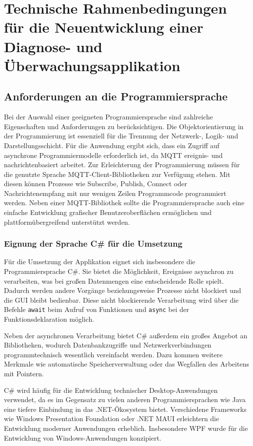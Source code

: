 \chapter{Technische Rahmenbedingungen für die Neuentwicklung einer Diagnose- und Überwachungsapplikation}
\label{cha:Anforderungsanalyse}
\section{Anforderungen an die Programmiersprache}
    Bei der Auswahl einer geeigneten Programmiersprache sind zahlreiche Eigenschaften und Anforderungen zu berücksichtigen. Die Objektorientierung in der Programmierung ist essenziell für die Trennung der Netzwerk-, Logik- und Darstellungsschicht. Für die Anwendung ergibt sich, dass ein Zugriff auf asynchrone Programmiermodelle erforderlich ist, da MQTT ereignis- und nachrichtenbasiert arbeitet.
    Zur Erleichterung der Programmierung müssen für die genutzte Sprache MQTT-Client-Bibliotheken zur Verfügung stehen. Mit diesen 
    können Prozesse wie Subscribe, Publish, Connect oder Nachrichtenempfang mit nur wenigen Zeilen Programmcode programmiert werden.
    Neben einer MQTT-Bibliothek sollte die Programmiersprache auch eine einfache Entwicklung grafischer Benutzeroberflächen ermöglichen und plattformübergreifend unterstützt werden.

    \subsection{Eignung der Sprache C\# für die Umsetzung}
       Für die Umsetzung der Applikation eignet sich insbesondere die Programmiersprache C\#. Sie bietet die Möglichkeit, Ereignisse asynchron zu verarbeiten, was bei großen Datenmengen eine entscheidende Rolle spielt. 
        Dadurch werden andere Vorgänge beziehungsweise Prozesse nicht blockiert und die GUI bleibt bedienbar. Diese nicht blockierende Verarbeitung wird über die Befehle \lstinline{await} beim Aufruf von Funktionen und \lstinline{async} bei der Funktionsdeklaration möglich. \autocite[334--343]{AsyncAwait}
        
        Neben der asynchronen Verarbeitung bietet C\# außerdem ein großes Angebot an Bibliotheken, wodurch Datenbankzugriffe und Netzwerkverbindungen programmtechnisch wesentlich vereinfacht werden. Dazu kommen weitere Merkmale wie automatische Speicherverwaltung oder das Wegfallen des Arbeitens mit Pointern. \autocite[6--7]{CSwith.NET}

        C\# wird häufig für die Entwicklung technischer Desktop-Anwendungen verwendet, da es im Gegensatz zu vielen anderen Programmiersprachen wie Java eine tiefere Einbindung in das .NET-Ökosystem bietet. Verschiedene Frameworks wie Windows Presentation Foundation oder .NET MAUI erleichtern die Entwicklung moderner Anwendungen erheblich. Insbesondere WPF wurde für die Entwicklung von Windows-Anwendungen konzipiert. \autocite[5--6]{CSwith.NET}
        

